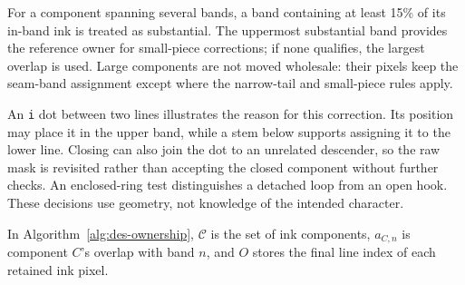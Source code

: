 For a component spanning several bands, a band containing at least 15\% of its in-band ink is treated as substantial. The uppermost substantial band provides the reference owner for small-piece corrections; if none qualifies, the largest overlap is used. Large components are not moved wholesale: their pixels keep the seam-band assignment except where the narrow-tail and small-piece rules apply.

An \texttt{i} dot between two lines illustrates the reason for this correction. Its position may place it in the upper band, while a stem below supports assigning it to the lower line. Closing can also join the dot to an unrelated descender, so the raw mask is revisited rather than accepting the closed component without further checks. An enclosed-ring test distinguishes a detached loop from an open hook. These decisions use geometry, not knowledge of the intended character.

In Algorithm~\ref{alg:des-ownership}, $\mathcal C$ is the set of ink components, $a_{C,n}$ is component $C$'s overlap with band $n$, and $O$ stores the final line index of each retained ink pixel.

\begin{designalgorithm}
\caption{Refining seam bands into ink ownership}
\label{alg:des-ownership}
\begin{designpseudo}
\end{designpseudo}
\end{designalgorithm}

